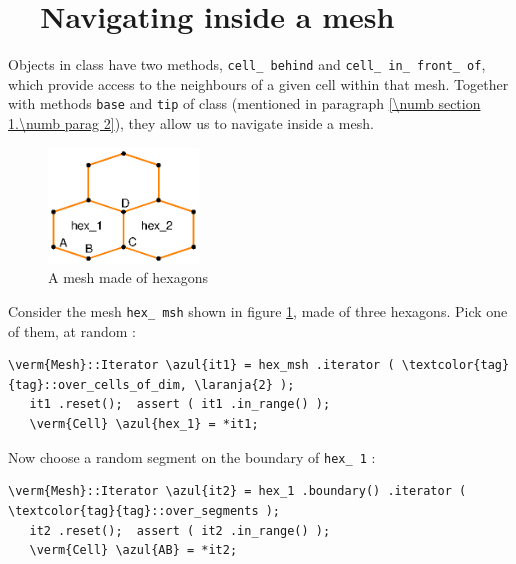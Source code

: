 \section{~~Navigating inside a mesh}\label{\numb section 9.\numb parag 6}

Objects in class {\small\tt {}} have two methods, {\small\tt cell\_\,behind} and
{\small\tt cell\_\,in\_\,front\_\,of},
which provide access to the neighbours of a given cell within that mesh.
Together with methods {\small\tt base} and {\small\tt tip} of class {\small\tt {}}
(mentioned in paragraph \ref{\numb section 1.\numb parag 2}), they allow us to navigate inside
a mesh.

\begin{figure}[ht] \centering
  \includegraphics[width=40mm]{malha-hex}
  \caption{A mesh made of hexagons}
  \label{\numb section 9.\numb fig 3}
\end{figure}

Consider the mesh {\small\tt hex\_\,msh} shown in figure \ref{\numb section 9.\numb fig 3},
made of three hexagons.
Pick one of them, at random :

\begin{Verbatim}[commandchars=\\\{\},formatcom=\small\tt,
   baselinestretch=0.94,framesep=2mm                      ]
   \verm{Mesh}::Iterator \azul{it1} = hex_msh .iterator ( \textcolor{tag}{tag}::over_cells_of_dim, \laranja{2} );
   it1 .reset();  assert ( it1 .in_range() );
   \verm{Cell} \azul{hex_1} = *it1;
\end{Verbatim}

Now choose a random segment on the boundary of {\small\tt hex\_\,1} :

\begin{Verbatim}[commandchars=\\\{\},formatcom=\small\tt,
   baselinestretch=0.94,framesep=2mm                      ]
   \verm{Mesh}::Iterator \azul{it2} = hex_1 .boundary() .iterator ( \textcolor{tag}{tag}::over_segments );
   it2 .reset();  assert ( it2 .in_range() );
   \verm{Cell} \azul{AB} = *it2;
\end{Verbatim}

